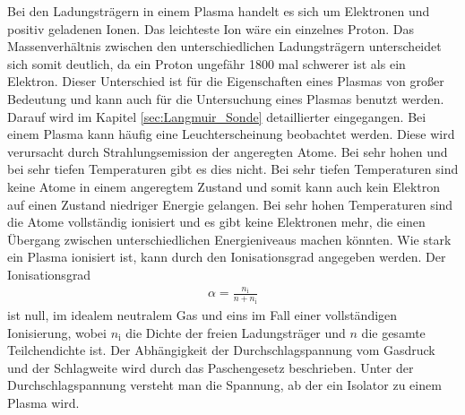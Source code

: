 Bei den Ladungsträgern in einem Plasma handelt es sich um Elektronen und positiv geladenen Ionen. Das leichteste Ion wäre ein einzelnes Proton. Das Massenverhältnis zwischen den unterschiedlichen Ladungsträgern unterscheidet sich somit deutlich, da ein Proton ungefähr 1800 mal schwerer ist als ein Elektron. Dieser Unterschied ist für die Eigenschaften eines Plasmas von großer Bedeutung und kann auch für die Untersuchung eines Plasmas benutzt werden. Darauf wird im Kapitel \ref{sec:Langmuir_Sonde} detaillierter eingegangen. Bei einem Plasma kann häufig eine Leuchterscheinung beobachtet werden. Diese wird verursacht durch Strahlungsemission  der angeregten Atome. Bei sehr hohen und bei sehr tiefen Temperaturen gibt es dies nicht. Bei sehr tiefen Temperaturen sind keine Atome in einem angeregtem Zustand und somit kann auch kein Elektron auf einen Zustand niedriger Energie gelangen. Bei sehr hohen Temperaturen sind die Atome vollständig ionisiert und es gibt keine Elektronen mehr, die einen Übergang zwischen unterschiedlichen Energieniveaus machen könnten. Wie stark ein Plasma ionisiert ist, kann durch den  Ionisationsgrad angegeben werden. Der Ionisationsgrad 
\begin{align}
  \alpha=\frac{n_{\mathrm{i}}}{n + n_{\mathrm{i}}}
\end{align}
ist null, im idealem neutralem Gas und eins im Fall einer vollständigen Ionisierung, wobei $n_{\mathrm{i}}$ die Dichte der freien Ladungsträger und $n$ die gesamte Teilchendichte ist. Der Abhängigkeit der Durchschlagspannung vom Gasdruck und der Schlagweite wird durch das Paschengesetz beschrieben. Unter der Durchschlagspannung versteht man die Spannung, ab der ein Isolator zu einem Plasma wird. 
